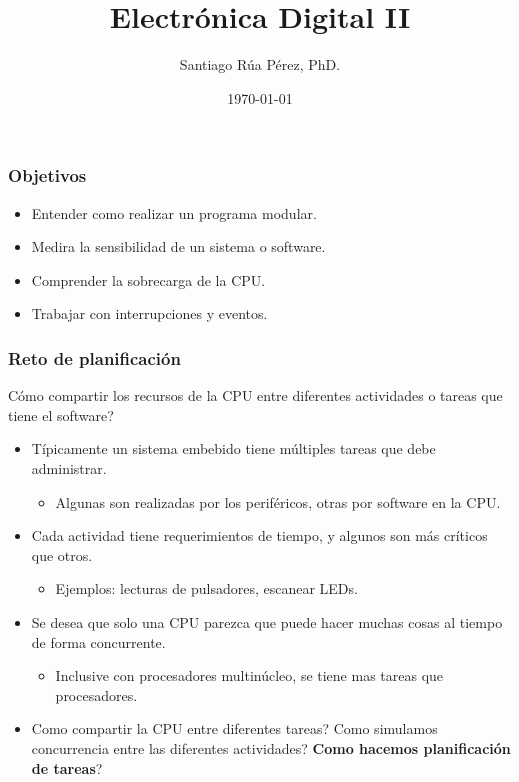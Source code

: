 \documentclass[10.5pt,scale=1.0,t,aspectratio=169,hyperref={pdfpagelabels=false}]{beamer}
\title{Electrónica Digital II}
\author{Santiago Rúa Pérez, PhD.}
\date{\today}
\begin{document}
	\begin{frame}
		\titlepage
	\end{frame}
	\frame{
		\begin{center}
			\LARGE \textcolor{blue}{CONCURRENCIA BÁSICA}
		\end{center}
		
	}
	

\begin{frame}
\frametitle{Objetivos}
\begin{itemize}
\item Entender como realizar un programa modular.
\item Medira la sensibilidad de un sistema o software.
\item Comprender la sobrecarga de la CPU.
\item Trabajar con interrupciones y eventos. 
\end{itemize}
\end{frame}
\begin{frame}
	\frametitle{Reto de planificación}
	Cómo compartir los recursos de la CPU entre diferentes actividades o tareas que tiene el software?
	\begin{itemize}
		\item Típicamente un sistema embebido tiene múltiples tareas que debe administrar.
		\begin{itemize}
			\item Algunas son realizadas por los periféricos, otras por software en la CPU.
		\end{itemize}  
		\item Cada actividad tiene requerimientos de tiempo, y algunos son más críticos que otros. 
		\begin{itemize}
			\item Ejemplos: lecturas de pulsadores, escanear LEDs.
		\end{itemize} 
		\item Se desea que solo una CPU parezca que puede hacer muchas cosas al tiempo de forma concurrente. 
		\begin{itemize}
			\item Inclusive con procesadores multinúcleo, se tiene mas tareas que procesadores. 
		\end{itemize}
		\item Como compartir la CPU entre diferentes tareas? Como simulamos concurrencia entre las diferentes actividades? \textbf{Como hacemos planificación de tareas}?
	\end{itemize}
\end{frame}
\end{document}
